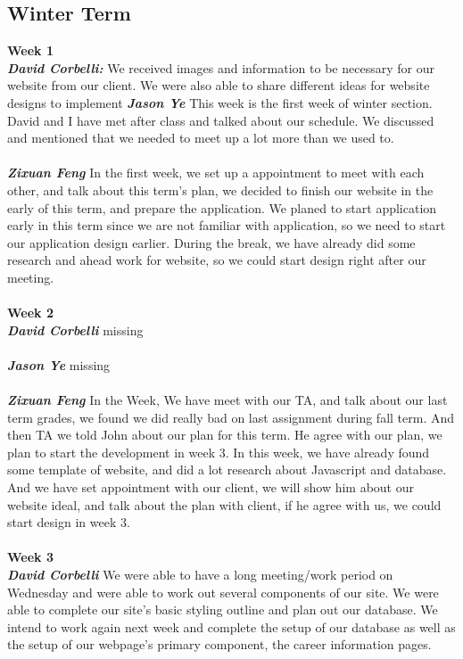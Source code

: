 \documentclass[onecolumn, draftclsnofoot,10pt, compsoc]{IEEEtran}
\begin{document}
\subsection{Winter Term}
\textbf{Week 1}
\\ \textbf{\textit{David Corbelli:}}
\noindent We received images and information to be necessary for our website from our client. We were also able to share different ideas for website designs to implement
\textbf{\textit{Jason Ye}}
This week is the first week of winter section. David and I have met after class and talked about our schedule. We discussed and mentioned that we needed to meet up a lot more than we used to.\\ \\
\textbf{\textit{Zixuan Feng}}
In the first week, we set up a appointment to meet with each other, and talk about this term's plan, we decided to finish our website in the early of this term, and prepare the application. We planed to start application early in this term since we are not familiar with application, so we need to start our application design earlier. During the break, we have already did some research and ahead work for website, so we could start design right after our meeting.\\ \\
\textbf{Week 2}
\\ \textbf{\textit{David Corbelli}}
missing\\ \\
\textbf{\textit{Jason Ye}}
missing\\ \\
\textbf{\textit{Zixuan Feng}}
In the Week, We have meet with our TA, and talk about our last term grades, we found we did really bad on last assignment during fall term. And then TA we told John about our plan for this term. He agree with our plan, we plan to start the development in week 3. In this week, we have already found some template of website, and did a lot research about Javascript and database. And we have set appointment with our client, we will show him about our website ideal, and talk about the plan with client, if he agree with us, we could start design in week 3.\\ \\
\textbf{Week 3}
\\ \textbf{\textit{David Corbelli}}
We were able to have a long meeting/work period on Wednesday and were able to work out several components of our site. We were able to complete our site's basic styling outline and plan out our database. We intend to work again next week and complete the setup of our database as well as the setup of our webpage's primary component, the career information pages.\\ \\
\end{document}
